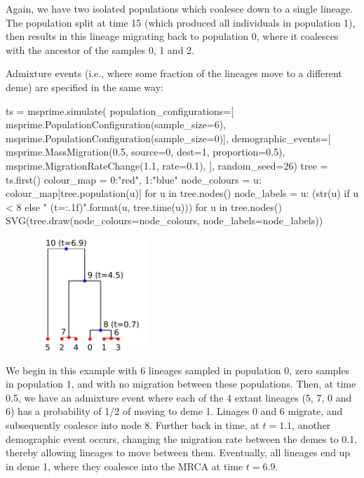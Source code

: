 \documentclass[graybox]{svmult}
\newcommand{\includenbimage}[1]{\begin{center}\texttt{[image: \#1]}\end{center}}
\begin{document}
Again, we have two isolated populations which coalesce down to a single
lineage. The population split at time 15 (which produced all individuals
in population 1), then results in this lineage migrating back to
population 0, where it coalesces with the ancestor of the samples 0, 1
and 2.

Admixture events (i.e., where some fraction of the lineages move to a
different deme) are specified in the same way:

\begin{pythoncode}
ts  = msprime.simulate(
    population_configurations=[
        msprime.PopulationConfiguration(sample_size=6),
        msprime.PopulationConfiguration(sample_size=0)],
    demographic_events=[
        msprime.MassMigration(0.5, source=0, dest=1, proportion=0.5),
        msprime.MigrationRateChange(1.1, rate=0.1),
    ],
    random_seed=26)
tree = ts.first()
colour_map = {0:"red", 1:"blue"}
node_colours = {u: colour_map[tree.population(u)] for u in tree.nodes()}
node_labels = {
    u: (str(u) if u < 8 else "{} (t={:.1f})".format(u, tree.time(u)))
    for u in tree.nodes()}
SVG(tree.draw(node_colours=node_colours, node_labels=node_labels))
\end{pythoncode}

\begin{figure}
  \begin{center}
    \includegraphics[width=0.38\textwidth]{images/simulations_39_0.pdf}
  \end{center}
\end{figure}

    We begin in this example with 6 lineages sampled in population 0, zero
samples in population 1, and with no migration between these
populations. Then, at time 0.5, we have an admixture event where each of
the 4 extant lineages (5, 7, 0 and 6) has a probability of 1/2 of moving
to deme 1. Linages 0 and 6 migrate, and subsequently coalesce into node
8. Further back in time, at \(t=1.1\), another demographic event occurs,
changing the migration rate between the demes to 0.1, thereby allowing
lineages to move between them. Eventually, all lineages end up in deme
1, where they coalesce into the MRCA at time \(t=6.9\).
\end{document}
